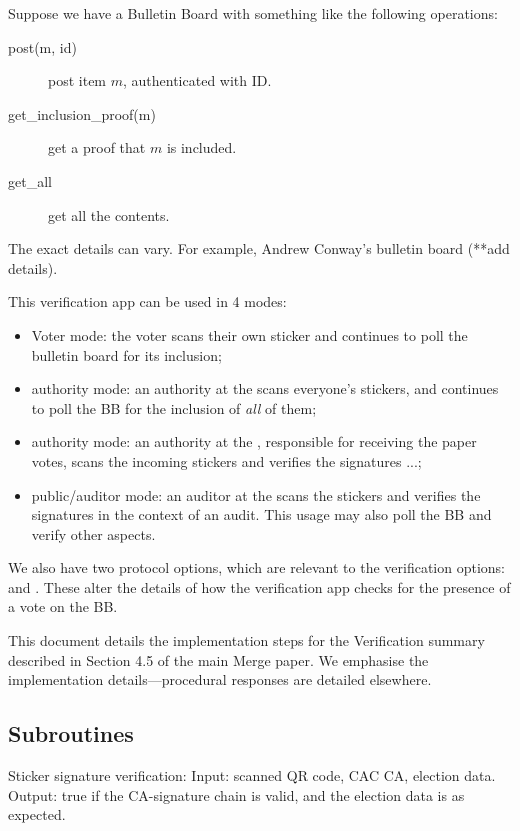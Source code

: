 \documentclass{article}
\begin{document}
Suppose we have a Bulletin Board with something like the following operations:
    \begin{description}
        \item[post(m, id)] post item $m$, authenticated with ID.
        \item[get\_inclusion\_proof(m)] get a proof that $m$ is included.
        \item[get\_all] get all the contents.
    \end{description}
    The exact details can vary. For example, Andrew Conway's bulletin board (**add details).

    This verification app can be used in 4 modes:
    \begin{itemize}
        \item Voter mode: the voter scans their own sticker and continues to poll the bulletin board for its inclusion;
        \item \remoteVotingCenter{} authority mode: an authority at the \remoteVotingCenter{} scans everyone's stickers, and continues to poll the BB for the inclusion of \emph{all} of them;
        \item \localVotingCenter{} authority mode: an authority at the \localVotingCenter{}, responsible for receiving the paper votes, scans the incoming stickers and verifies the signatures ...;
        \item \localVotingCenter{} public/auditor mode: an auditor at the \localVotingCenter{} scans the stickers and verifies the signatures in the context of an audit. This usage may also poll the BB and verify other aspects.
    \end{itemize}

    We also have two protocol options, which are relevant to the verification options:
    \BBInclusionCheck{} and \StickerBBUpload{}. These alter the details of how the verification app checks for the presence of a vote on the BB.

    This document details the implementation steps for the Verification summary described in Section 4.5 of the main Merge paper. We emphasise the implementation details---procedural responses are detailed elsewhere.

\subsection{Subroutines}
Sticker signature verification:
    Input: scanned QR code, CAC CA, election data.
    Output: true if the CA-signature chain is valid, and the election data is as expected.
\end{document}
